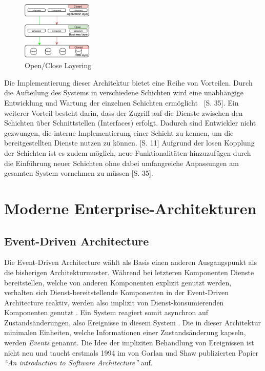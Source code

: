 \documentclass[acmtog]{acmart}
\begin{document}
\begin{figure}[h!]
    \centering
    \includegraphics[width=0.3\textwidth]{images/layer2.pdf}
    \caption{Open/Close Layering}
    \label{fig:layered-request-flow}
\end{figure}

Die Implementierung dieser Architektur bietet eine Reihe von Vorteilen.
Durch die Aufteilung des Systems in verschiedene Schichten wird eine unabhängige
Entwicklung und Wartung der einzelnen Schichten ermöglicht ~\cite{layered2}[S. 35].
Ein weiterer Vorteil besteht darin, dass der Zugriff auf die Dienste zwischen den
Schichten über Schnittstellen (Interfaces) erfolgt.
Dadurch sind Entwickler nicht gezwungen, die interne Implementierung einer Schicht zu kennen, um die bereitgestellten
Dienste nutzen zu können. \cite{layered4}[S. 11]
Aufgrund der losen Kopplung der Schichten ist es zudem möglich, neue Funktionalitäten
hinzuzufügen durch die Einführung neuer Schichten ohne dabei umfangreiche Anpassungen am gesamten
System vornehmen zu müssen \cite{layered2}[S. 35].
\section{Moderne Enterprise-Architekturen}

\subsection{Event-Driven Architecture}
Die Event-Driven Architecture wählt als Basis einen anderen Ausgangspunkt als die bisherigen Architekturmuster.
Während bei letzteren Komponenten Dienste bereitstellen, welche von anderen Komponenten explizit genutzt werden,
verhalten sich Dienst-bereitstellende Komponenten in der Event-Driven Architecture reaktiv,
werden also implizit von Dienst-konsumierenden Komponenten genutzt \cite{garlanShawImplizit}.
Ein System reagiert somit asynchron auf Zustandsänderungen, also Ereignisse in diesem System \cite{eda}.
Die in dieser Architektur minimalen Einheiten, welche Informationen einer Zustandsänderung kapseln, werden \textit{Events} genannt.
Die Idee der impliziten Behandlung von Ereignissen ist nicht neu und taucht erstmals 1994 im von Garlan und Shaw publizierten Papier
\textit{\enquote{An introduction to Software Architecture}} auf.
\end{document}
